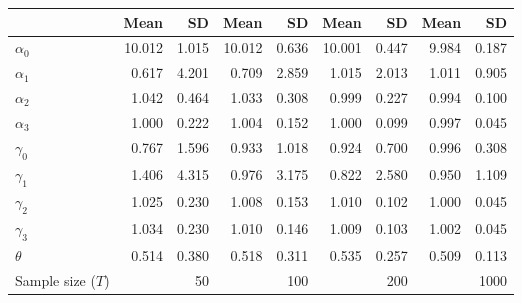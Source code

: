 
\begin{tabular}[t]{lrrrrrrrr}
\toprule
  & Mean & SD & Mean  & SD  & Mean   & SD   & Mean    & SD   \\
\midrule
$\alpha_{0}$ & 10.012 & 1.015 & 10.012 & 0.636 & 10.001 & 0.447 & 9.984 & 0.187\\
$\alpha_{1}$ & 0.617 & 4.201 & 0.709 & 2.859 & 1.015 & 2.013 & 1.011 & 0.905\\
$\alpha_{2}$ & 1.042 & 0.464 & 1.033 & 0.308 & 0.999 & 0.227 & 0.994 & 0.100\\
$\alpha_{3}$ & 1.000 & 0.222 & 1.004 & 0.152 & 1.000 & 0.099 & 0.997 & 0.045\\
$\gamma_{0}$ & 0.767 & 1.596 & 0.933 & 1.018 & 0.924 & 0.700 & 0.996 & 0.308\\
$\gamma_{1}$ & 1.406 & 4.315 & 0.976 & 3.175 & 0.822 & 2.580 & 0.950 & 1.109\\
$\gamma_{2}$ & 1.025 & 0.230 & 1.008 & 0.153 & 1.010 & 0.102 & 1.000 & 0.045\\
$\gamma_{3}$ & 1.034 & 0.230 & 1.010 & 0.146 & 1.009 & 0.103 & 1.002 & 0.045\\
$\theta$ & 0.514 & 0.380 & 0.518 & 0.311 & 0.535 & 0.257 & 0.509 & 0.113\\
Sample size ($T$) &  & 50 &  & 100 &  & 200 &  & 1000\\
\bottomrule
\end{tabular}
